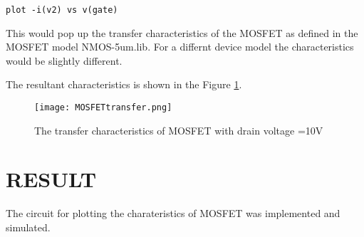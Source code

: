 \texttt{plot -i(v2) vs v(gate)}

This would pop up the transfer characteristics of the MOSFET as defined in the MOSFET model NMOS-5um.lib. For a differnt device model the characteristics would be slightly different.

The resultant characteristics is shown in the Figure \ref{MOSFETtransfer}.


\begin{figure}[h]
\centering
\texttt{[image: MOSFETtransfer.png]}
\caption{The transfer characteristics of MOSFET with drain voltage =10V }
\label{MOSFETtransfer}
\end{figure}


\section*{RESULT}
The circuit for plotting the charateristics of MOSFET was implemented and simulated.


